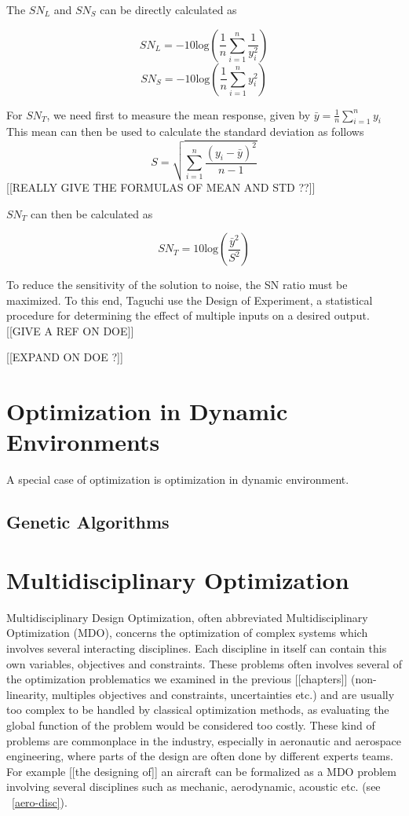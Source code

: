 The $SN_L$ and $SN_S$ can be directly calculated as

\[SN_L = -10\text{log}\left( \frac{1}{n} \sum_{i=1}^n \frac{1}{y_i^2} \right)\]
\[SN_S = -10\text{log}\left( \frac{1}{n} \sum_{i=1}^n y_i^2 \right)\]

For $SN_T$, we need first to measure the mean response, given by $\bar{y} = \frac{1}{n}\sum_{i=1}^n y_i$
This mean can then be used to calculate the standard deviation as follows 
\[S = \sqrt{\sum_{i=1}^n \frac{(y_i - \bar{y})^2}{n-1}}\]
[[REALLY GIVE THE FORMULAS OF MEAN AND STD ??]]

 $SN_T$ can then be calculated as
 
 \[ SN_T = 10\text{log}\left(\frac{\bar{y}^2}{S^2}\right) \]
 
 To reduce the sensitivity of the solution to noise, the SN ratio must be maximized. To this end, Taguchi use the Design of Experiment, a statistical procedure for determining the effect of multiple inputs on a desired output. [[GIVE A REF ON DOE]]

[[EXPAND ON DOE  ?]]

\subsection{}

\chapter{Optimization in Dynamic Environments}
A special case of optimization is optimization in dynamic environment.

\section{Genetic Algorithms}

\chapter{Multidisciplinary Optimization}

Multidisciplinary Design Optimization, often abbreviated Multidisciplinary Optimization (MDO), concerns the optimization of complex systems which involves several interacting disciplines. Each discipline in itself can contain this own variables, objectives and constraints. These problems often involves several of the optimization problematics we examined in the previous [[chapters]] (non-linearity, multiples objectives and constraints, uncertainties etc.) and are usually too complex to be handled by classical optimization methods, as evaluating the global function of the problem would be considered too costly.
These kind of problems are commonplace in the industry, especially in aeronautic and aerospace engineering, where parts of the design are often done by different experts teams. For example [[the designing of]] an aircraft can be formalized as a MDO problem involving several disciplines such as mechanic, aerodynamic, acoustic etc. (see \figurename\ \ref{aero-disc}).

